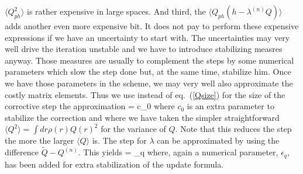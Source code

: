 $\langle Q_{ph}^2\rangle$ is rather expensive in large spaces.
And third, the $\langle Q_{ph} \left(h - \lambda^{(n)} Q\right)\rangle$
adds another even more expensive bit. It does not pay to perform these
expensive expressions if we have an uncertainty to start with. The
uncertainties may very well drive the iteration unstable and we have
to introduce stabilizing measres anyway. Those measures are usually
to complement the steps by some numerical parameters which slow the
step done but, at the same time, stabilize him. Once we have those
parameters in the scheme, we may very well also approximate the costly
matrix elements. Thus we use instead of eq.~(\ref{Qsize}) for
the size of the corrective step the approximation
\be
  \gamma = c_0 
\ee
where $c_0$ is an extra parameter to stabilize the
correction and where we have taken the simpler straightforward
$\langle Q^2\rangle = \int dr \rho(r) Q(r)^2$ for the variance of $Q$.
Note that this reduces the step the more the larger $\langle Q \rangle$
is. The step for $\lambda$ can be approximated by using the
difference $\tilde{Q}-Q^{(n)}$. This yields
\be
    \delta \lambda = \epsilon_q 
\ee
where, again a numerical parameter, $\epsilon_q$, has been added
for extra stabilization of the update formula.









